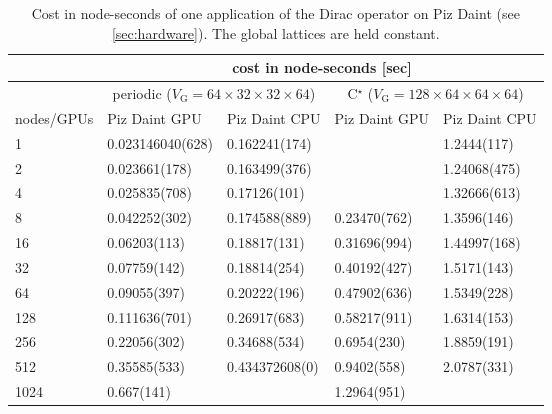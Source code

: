 \begin{table*}
\begin{tabular}{l|ll|ll}
\toprule
 & \multicolumn{4}{c}{cost in node-seconds [sec]} \\
\midrule
 & \multicolumn{2}{c}{periodic ($V_\mathrm{G}=64\times32\times32\times64$)} & \multicolumn{2}{c}{C$^\star$ ($V_\mathrm{G}=128\times64\times64\times64$)} \\
\midrule
nodes/GPUs & Piz Daint GPU & Piz Daint CPU & Piz Daint GPU & Piz Daint CPU \\
\midrule
   1 & 0.023146040(628) &  0.162241(174) &              &  1.2444(117) \\
   2 &    0.023661(178) &  0.163499(376) &              & 1.24068(475) \\
   4 &    0.025835(708) &   0.17126(101) &              & 1.32666(613) \\
   8 &    0.042252(302) &  0.174588(889) & 0.23470(762) &  1.3596(146) \\
  16 &     0.06203(113) &   0.18817(131) & 0.31696(994) & 1.44997(168) \\
  32 &     0.07759(142) &   0.18814(254) & 0.40192(427) &  1.5171(143) \\
  64 &     0.09055(397) &   0.20222(196) & 0.47902(636) &  1.5349(228) \\
 128 &    0.111636(701) &   0.26917(683) & 0.58217(911) &  1.6314(153) \\
 256 &     0.22056(302) &   0.34688(534) &  0.6954(230) &  1.8859(191) \\
 512 &     0.35585(533) & 0.434372608(0) &  0.9402(558) &  2.0787(331) \\
1024 &       0.667(141) &                &  1.2964(951) &              \\
\bottomrule
\end{tabular}
\caption{Cost in node-seconds of one application of the Dirac operator on Piz Daint (see \cref{sec:hardware}). The global lattices are held constant.}
\label{tab:nodehours_daint}
\end{table*}

